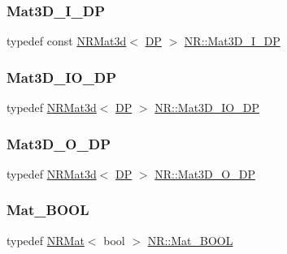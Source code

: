 \mbox{\label{namespaceNR_a3cb7a4c8eb0a2a98a239a9a8200ec5d8}} 
\subsubsection{\texorpdfstring{Mat3D\_I\_DP}{Mat3D\_I\_DP}}
{\footnotesize\ttfamily typedef const \mbox{\hyperlink{classNR_1_1NRMat3d}{N\+R\+Mat3d}}$<$ \mbox{\hyperlink{namespaceNR_af6ff762dd605ff477b8e52387253a02a}{DP}} $>$ \mbox{\hyperlink{namespaceNR_a3cb7a4c8eb0a2a98a239a9a8200ec5d8}{N\+R\+::\+Mat3\+D\+\_\+\+I\+\_\+\+DP}}}

\mbox{\label{namespaceNR_ae2c061d1bcce9ea856c905d761956d76}} 
\subsubsection{\texorpdfstring{Mat3D\_IO\_DP}{Mat3D\_IO\_DP}}
{\footnotesize\ttfamily typedef \mbox{\hyperlink{classNR_1_1NRMat3d}{N\+R\+Mat3d}}$<$ \mbox{\hyperlink{namespaceNR_af6ff762dd605ff477b8e52387253a02a}{DP}} $>$ \mbox{\hyperlink{namespaceNR_ae2c061d1bcce9ea856c905d761956d76}{N\+R\+::\+Mat3\+D\+\_\+\+I\+O\+\_\+\+DP}}}

\mbox{\label{namespaceNR_a74d09ea99e0452b529d2eb055cb09108}} 
\subsubsection{\texorpdfstring{Mat3D\_O\_DP}{Mat3D\_O\_DP}}
{\footnotesize\ttfamily typedef \mbox{\hyperlink{classNR_1_1NRMat3d}{N\+R\+Mat3d}}$<$ \mbox{\hyperlink{namespaceNR_af6ff762dd605ff477b8e52387253a02a}{DP}} $>$ \mbox{\hyperlink{namespaceNR_a74d09ea99e0452b529d2eb055cb09108}{N\+R\+::\+Mat3\+D\+\_\+\+O\+\_\+\+DP}}}

\mbox{\label{namespaceNR_a59411c0161320f28563d72f97b88ad69}} 
\subsubsection{\texorpdfstring{Mat\_BOOL}{Mat\_BOOL}}
{\footnotesize\ttfamily typedef \mbox{\hyperlink{classNR_1_1NRMat}{N\+R\+Mat}}$<$ bool $>$ \mbox{\hyperlink{namespaceNR_a59411c0161320f28563d72f97b88ad69}{N\+R\+::\+Mat\+\_\+\+B\+O\+OL}}}

